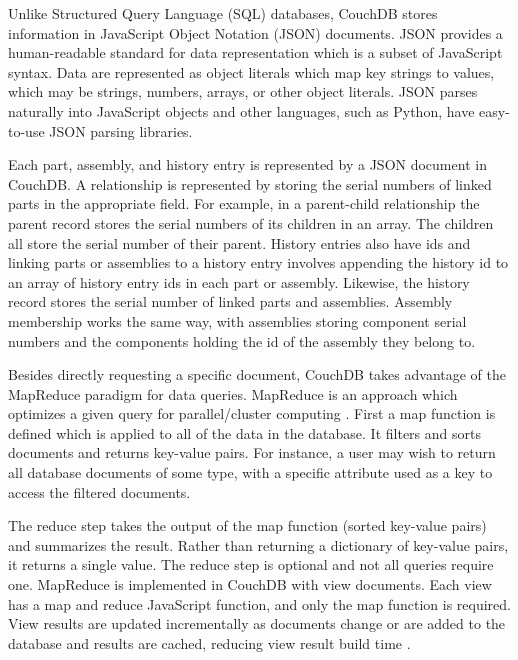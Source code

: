 \documentclass[journal]{IEEEtran}
\begin{document}
Unlike Structured Query Language (SQL) databases, CouchDB stores information in JavaScript Object Notation (JSON) \cite{json}
documents.
JSON provides a human-readable
standard for data representation which is a subset of JavaScript syntax. Data are represented as object
literals which map key strings to values, which may be strings, numbers, arrays, or other object literals. 
JSON parses naturally into JavaScript objects and other languages, such as Python, have easy-to-use
JSON parsing libraries. 

Each part, assembly, and history entry is represented by a JSON document in CouchDB. A relationship
is represented by storing the serial numbers of linked parts in the appropriate field. For example, in a parent-child relationship the parent record stores the serial numbers
of its children in an array. The children all store the serial number of their parent. History entries also have ids and linking
parts or assemblies to a history entry involves appending the history id to an array of history entry ids in each part or assembly. Likewise,
the history record stores the serial number of linked parts and assemblies. Assembly membership works the same way, with assemblies
storing component serial numbers and the components holding the id of the assembly they belong to.

Besides directly requesting a specific document, CouchDB takes advantage of the MapReduce paradigm for data
queries. MapReduce is an approach which optimizes a given query for parallel/cluster computing \cite{mapreduce_dean}. First a map function
is defined which is applied to all of the data in the database. It filters and sorts documents and returns key-value
pairs. For instance, a user may wish to return all database documents of some type, with a specific attribute used as
a key to access the filtered documents. 

The reduce step takes the output of the map function (sorted key-value pairs) and summarizes the result. Rather than returning a dictionary
of key-value pairs, it returns a single value. The reduce
step is optional and not all queries require one. MapReduce is implemented in CouchDB with view documents. Each view has
a map and reduce JavaScript function, and only the map function is required. View results are updated incrementally as
documents change or are added to the database and results are cached, reducing view result build time \cite{couchdb_guide}.
\end{document}
